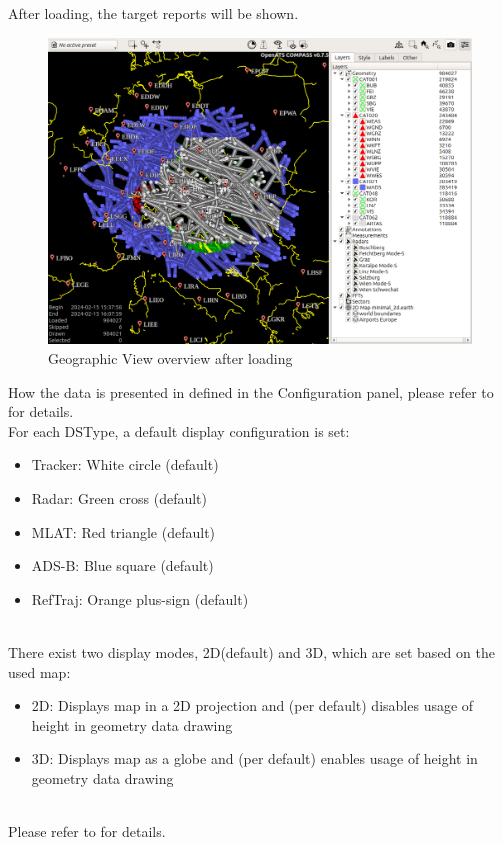After loading, the target reports will be shown.

\begin{figure}[H]
    \hspace*{-2.5cm}
    \includegraphics[width=19cm,frame]{figures/geoview_overview_loaded.png}
  \caption{Geographic View overview after loading}
\end{figure} 

How the data is presented in defined in the Configuration panel, please refer to  for details. \\

For each DSType, a default display configuration is set:

\begin{itemize}
 \item Tracker: White circle (default)
 \item Radar: Green cross (default)
 \item MLAT: Red triangle (default)
 \item ADS-B: Blue square (default)
 \item RefTraj: Orange plus-sign (default)
\end{itemize}
\ \\

There exist two display modes, 2D(default) and 3D, which are set based on the used map:

\begin{itemize}
 \item 2D: Displays map in a 2D projection and (per default) disables usage of height in geometry data drawing
 \item 3D: Displays map as a globe and (per default) enables usage of height in geometry data drawing
\end{itemize}
\ \\
Please refer to  for details.
